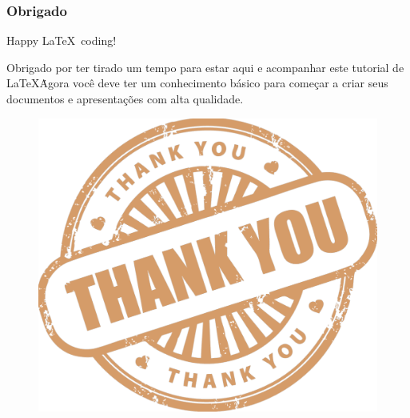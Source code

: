 \begin{frame}
\frametitle{Obrigado}

Happy \LaTeX\ coding!

Obrigado por ter tirado um tempo para estar aqui e acompanhar este tutorial de \LaTeX\. Agora você
deve ter um conhecimento básico para começar a criar seus documentos e apresentações com alta
qualidade.
\begin{figure}
\includegraphics[scale=.05]{../img/thank-you}
\end{figure}

\end{frame}

